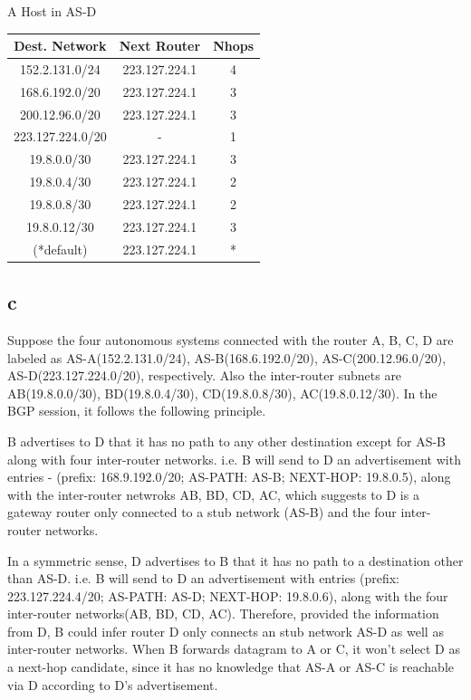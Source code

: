 \documentclass[a4paper, 11pt]{article}
\begin{document}
	\begin{center}
		A Host in AS-D \\
		\vspace{2mm}
		
		\begin{tabular}{|c|c|c|}
			\hline
			Dest. Network  & Next Router & Nhops\\ 
			\hline
				152.2.131.0/24 & 223.127.224.1 & 4\\ 
				168.6.192.0/20 & 223.127.224.1 & 3\\ 
				200.12.96.0/20 & 223.127.224.1 & 3\\ 
				223.127.224.0/20 & - & 1\\ 
				19.8.0.0/30 & 223.127.224.1 & 3\\ 
				19.8.0.4/30 & 223.127.224.1 & 2\\ 
				19.8.0.8/30 & 223.127.224.1 & 2\\ 
				19.8.0.12/30 & 223.127.224.1 & 3\\ 
				(*default) & 223.127.224.1 & *\\
			\hline
		\end{tabular}
	\end{center}


\subsection{c}
	Suppose the four autonomous systems connected with the router A, B, C, D are
	labeled as AS-A(152.2.131.0/24), AS-B(168.6.192.0/20), AS-C(200.12.96.0/20),
	AS-D(223.127.224.0/20), respectively. Also the inter-router subnets are
	AB(19.8.0.0/30), BD(19.8.0.4/30), CD(19.8.0.8/30), AC(19.8.0.12/30). In the BGP
	session, it follows the following principle.
	
	B advertises to D that it has no path to any other destination except for AS-B
	along with four inter-router networks. i.e. B will send to D an advertisement
	with entries - (prefix: 168.9.192.0/20; AS-PATH: AS-B; NEXT-HOP: 19.8.0.5),
	along with the inter-router netwroks AB, BD, CD, AC, which suggests to D is a
	gateway router only connected to a stub network (AS-B) and the four
	inter-router networks. 
	
	In a symmetric sense, D advertises to B that it has no path to a destination
	other than AS-D. i.e. B will send to D an advertisement with entries (prefix:
	223.127.224.4/20; AS-PATH: AS-D; NEXT-HOP: 19.8.0.6), along with the four
	inter-router networks(AB, BD, CD, AC). Therefore, provided the information from
	D, B could infer router D only connects an stub network AS-D as well as
	inter-router networks. When B forwards datagram to A or C, it won't select D
	as a next-hop candidate, since it has no knowledge that AS-A or AS-C is
	reachable via D according to D's advertisement.
	
\end{document}
